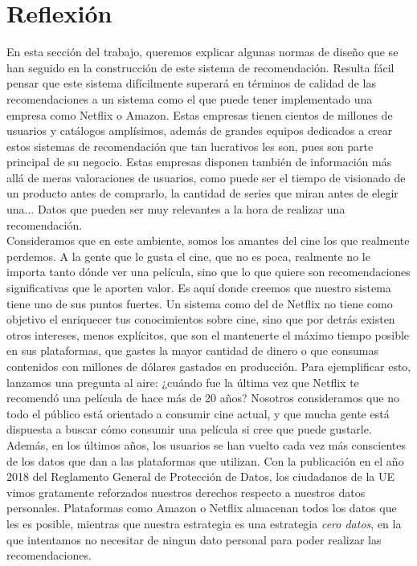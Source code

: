 \section{Reflexión}\label{sec:reflexion}

En esta sección del trabajo, queremos explicar algunas normas de diseño que se han seguido en la construcción de este sistema de recomendación. Resulta fácil pensar que este sistema difícilmente superará en términos de calidad de las recomendaciones a un sistema como el que puede tener implementado una empresa como Netflix o Amazon. Estas empresas tienen cientos de millones de usuarios y catálogos amplísimos, además de grandes equipos dedicados a crear estos sistemas de recomendación que tan lucrativos les son, pues son parte principal de su negocio. Estas empresas disponen también de información más allá de meras valoraciones de usuarios, como puede ser el tiempo de visionado de un producto antes de comprarlo, la cantidad de series que miran antes de elegir una... Datos que pueden ser muy relevantes a la hora de realizar una recomendación.\\

Consideramos que en este ambiente, somos los amantes del cine los que realmente perdemos. A la gente que le gusta el cine, que no es poca, realmente no le importa tanto dónde ver una película, sino que lo que quiere son recomendaciones significativas que le aporten valor. Es aquí donde creemos que nuestro sistema tiene uno de sus puntos fuertes. Un sistema como del de Netflix no tiene como objetivo el enriquecer tus conocimientos sobre cine, sino que por detrás existen otros intereses, menos explícitos, que son el mantenerte el máximo tiempo posible en sus plataformas, que gastes la mayor cantidad de dinero o que consumas contenidos con millones de dólares gastados en producción. Para ejemplificar esto, lanzamos una pregunta al aire: ¿cuándo fue la última vez que Netflix te recomendó una película de hace más de 20 años? Nosotros consideramos que no todo el público está orientado a consumir cine actual, y que mucha gente está dispuesta a buscar cómo consumir una película si cree que puede gustarle.\\

Además, en los últimos años, los usuarios se han vuelto cada vez más conscientes de los datos que dan a las plataformas que utilizan. Con la publicación en el año 2018 del Reglamento General de Protección de Datos, los ciudadanos de la UE vimos gratamente reforzados nuestros derechos respecto a nuestros datos personales. Plataformas como Amazon o Netflix almacenan todos los datos que les es posible, mientras que nuestra estrategia es una estrategia \textit{cero datos}, en la que intentamos no necesitar de ningun dato personal para poder realizar las recomendaciones.\\


